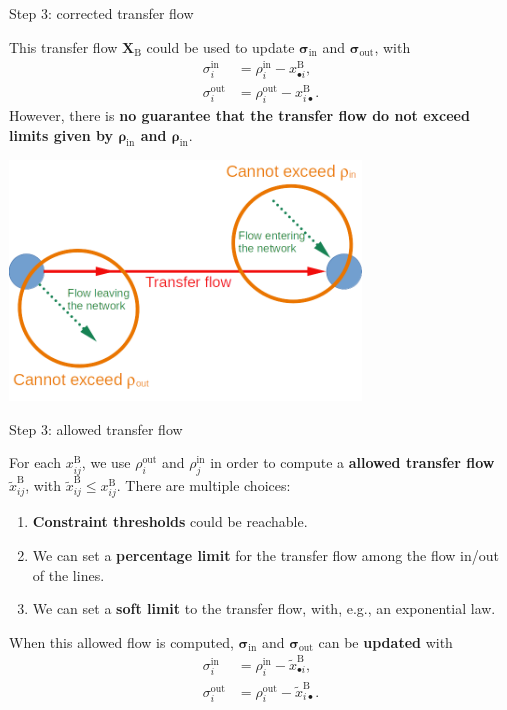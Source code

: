 \documentclass[10pt]{beamer}
\newcommand{\imp}[1]{\textbf{\color{cyan}#1}}
\begin{document}
	\begin{frame}{Step 3: corrected transfer flow}
		
		This transfer flow $\mathbf{X}_\text{B}$ could be used to update $\bm{\sigma}_\text{in}$ and $\bm{\sigma}_\text{out}$, with 
		\begin{align*}
			\sigma^\text{in}_i &= \rho^\text{in}_i - x^\text{B}_{\bullet i}, \\
			\sigma^\text{out}_i &= \rho^\text{out}_i - x^\text{B}_{i \bullet}.
		\end{align*}
		However, there is \imp{no guarantee that the transfer flow do not exceed limits given by $\bm{\rho}_\text{in}$ and $\bm{\rho}_\text{in}$}.
		\begin{center}
			\includegraphics[width=0.7\textwidth]{img/flow_constrained.png}
		\end{center}
	\end{frame}
	
	
	\begin{frame}{Step 3: allowed transfer flow}
		
		For each $x^\text{B}_{ij}$, we use $\rho^\text{out}_i$ and $\rho^\text{in}_j$ in order to compute a \imp{allowed transfer flow  $\widetilde{x}_{ij}^\text{B}$}, with  $\widetilde{x}_{ij}^\text{B} \leq x_{ij}^\text{B}$. There are multiple choices:
		
		\begin{enumerate}
			\item \imp{Constraint thresholds} could be reachable.
			\item We can set a \imp{percentage limit} for the transfer flow among the flow in/out of the lines.
			\item We can set a \imp{soft limit} to the transfer flow, with, e.g., an exponential law.
		\end{enumerate}
		
		When this allowed flow is computed, $\bm{\sigma}_\text{in}$ and $\bm{\sigma}_\text{out}$ can be \imp{updated} with 
		\begin{align*}
			\sigma^\text{in}_i &= \rho^\text{in}_i - \widetilde{x}^\text{B}_{\bullet i}, \\	\sigma^\text{out}_i &= \rho^\text{out}_i - \widetilde{x}^\text{B}_{i \bullet}.
		\end{align*}
	\end{frame}
	
\end{document}

